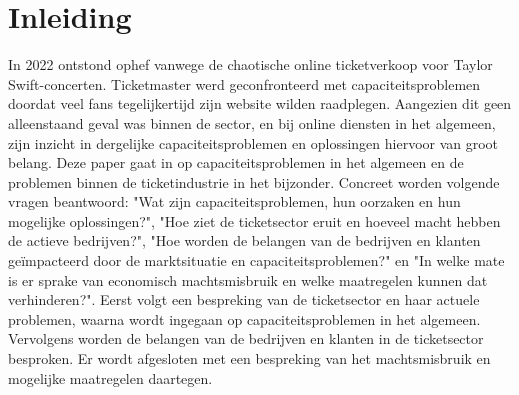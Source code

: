 
\section{Inleiding}

In 2022 ontstond ophef vanwege de chaotische online ticketverkoop voor
Taylor Swift-concerten. Ticketmaster %
werd geconfronteerd met capaciteitsproblemen doordat veel fans %
tegelijkertijd zijn website wilden raadplegen. Aangezien dit geen alleenstaand
geval was binnen de sector, en bij online diensten in het algemeen, zijn inzicht in 
dergelijke capaciteitsproblemen en oplossingen hiervoor van groot belang. %
Deze paper gaat in op capaciteitsproblemen in het algemeen en de problemen
binnen de ticketindustrie in het bijzonder. Concreet worden volgende vragen
beantwoord: "Wat zijn capaciteitsproblemen, hun oorzaken en hun mogelijke
oplossingen?", "Hoe ziet de ticketsector eruit en hoeveel macht hebben de
actieve bedrijven?", "Hoe worden de belangen van de bedrijven en klanten
geïmpacteerd door de marktsituatie en capaciteitsproblemen?" en
"In welke mate is er sprake van economisch machtsmisbruik en welke maatregelen
kunnen dat verhinderen?". Eerst volgt een bespreking van de ticketsector en
haar actuele problemen, waarna wordt ingegaan op capaciteitsproblemen
in het algemeen. Vervolgens worden de belangen van de bedrijven en klanten
in de ticketsector besproken. Er wordt afgesloten met een bespreking van het
machtsmisbruik en mogelijke maatregelen daartegen.